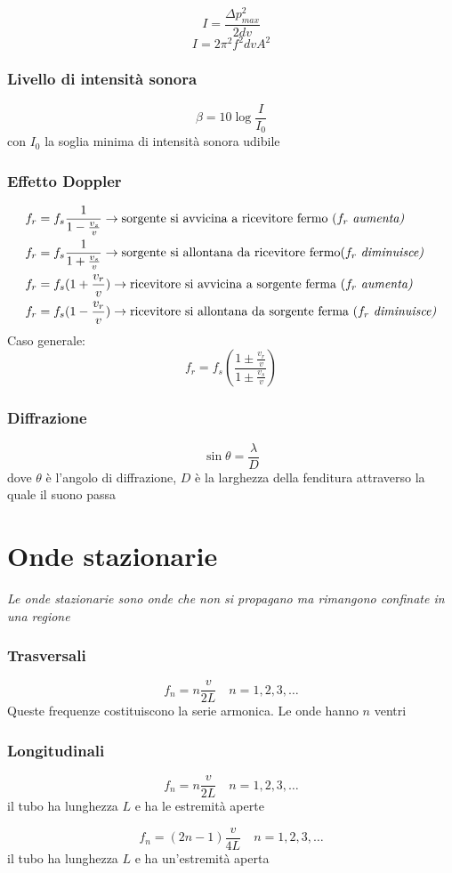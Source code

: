 \documentclass{article}
\begin{document}
\vspace{1em}

$$ I = \frac{\Delta p_{max}^2}{2dv} $$
$$ I = 2\pi^2 f^2 dvA^2 $$

\subsubsection*{Livello di intensità sonora}
$$ \beta = 10 \log\frac{I}{I_0} $$
con $I_0$ la soglia minima di intensità sonora udibile

\subsubsection*{Effetto Doppler}
\begin{align*}
    f_r &= f_s \frac{1}{1 - \frac{v_s}{v}} \rightarrow \text{sorgente si avvicina a ricevitore fermo ($f_r$ \textit{aumenta)}} \\
    f_r &= f_s \frac{1}{1 + \frac{v_s}{v}} \rightarrow \text{sorgente si allontana da ricevitore fermo($f_r$ \textit{diminuisce)}} \\
    f_r &= f_s(1 + \frac{v_r}{v}) \rightarrow \text{ricevitore si avvicina a sorgente ferma ($f_r$ \textit{aumenta)}} \\
    f_r &= f_s(1 - \frac{v_r}{v}) \rightarrow \text{ricevitore si allontana da sorgente ferma ($f_r$ \textit{diminuisce)}}
\end{align*}
Caso generale:
$$ f_r = f_s\left(\frac{1 \pm \frac{v_r}{v}}{1 \pm \frac{v_s}{v}}\right) $$

\subsubsection*{Diffrazione}
$$ \sin{\theta} = \frac{\lambda}{D} $$
dove $\theta$ è l'angolo di diffrazione, $D$ è la larghezza della fenditura attraverso la quale il suono passa

\section*{Onde stazionarie}
\textit{Le onde stazionarie sono onde che non si propagano ma rimangono confinate in una regione}

\subsubsection*{Trasversali}
$$ f_n = n \frac{v}{2L} \hspace{1em} n = 1,2,3,\dots $$
Queste frequenze costituiscono la serie armonica. Le onde hanno $n$ ventri

\subsubsection*{Longitudinali}
$$ f_n = n \frac{v}{2L} \hspace{1em} n = 1,2,3,\dots $$
il tubo ha lunghezza $L$ e ha le estremità aperte

\vspace{1em}
$$ f_n = (2n-1) \frac{v}{4L} \hspace{1em} n = 1,2,3,\dots $$
il tubo ha lunghezza $L$ e ha un'estremità aperta
\end{document}
